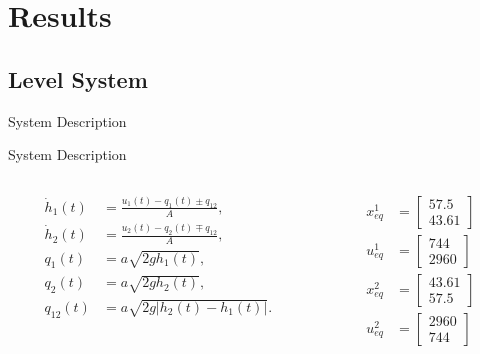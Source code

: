 
\section{Results}%
\label{sec:results}

\subsection{Level System}%
\label{subsec:level-system}

\begin{slide}{System Description}
  
\end{slide}

\begin{slide}{System Description}
  \begin{columns}[c]
    \begin{column}{0.48\textwidth}
      \begin{equation}
        \label{eq:formula-height-variation-lin}
        \begin{aligned}
          \dot{h}_1(t) & = \frac{u_1(t)-q_1(t)\pm{}q_{12}}{A},   \\
          \dot{h}_2(t) & = \frac{u_2(t)-q_2(t)\mp{}q_{12}}{A},   \\
          q_1(t)       & = a\sqrt{2gh_1(t)},                     \\
          q_2(t)       & = a\sqrt{2gh_2(t)},                     \\
          q_{12}(t)    & = a\sqrt{2g\left|h_2(t)-h_1(t)\right|}.
        \end{aligned}
      \end{equation}
    \end{column}%
    \hfill%
    \begin{column}{0.48\textwidth}
      \begin{equation}
        \begin{aligned}
          x_{eq}^1 & = \begin{bmatrix}
            57.5 \\ 43.61
          \end{bmatrix} \\
          u_{eq}^1 & = \begin{bmatrix}
            744 \\ 2960
          \end{bmatrix} \\
          x_{eq}^2 & = \begin{bmatrix}
            43.61 \\ 57.5
          \end{bmatrix} \\
          u_{eq}^2 & = \begin{bmatrix}
            2960 \\ 744
          \end{bmatrix}
        \end{aligned}
      \end{equation}
    \end{column}%
  \end{columns}
\end{slide}

